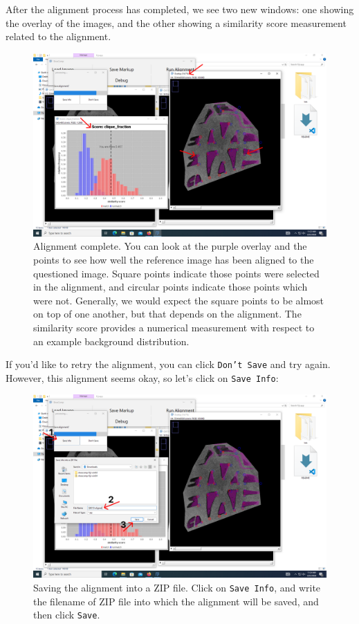 \documentclass[a4paper, oneside]{memoir}
\begin{document}
After the alignment process has completed, we see two new windows: one showing the overlay
of the images, and the other showing a similarity score measurement related to the
alignment.

\begin{figure}[H]
\begin{center}
	\includegraphics[width=0.8\linewidth]{images/step_8c-anno.png}
\end{center}
\caption{Alignment complete. You can look at the purple overlay and the points to see how well the reference image has been aligned to the questioned image. Square points indicate those points were selected in the alignment, and circular points indicate those points which were not. Generally, we would expect the square points to be almost on top of one another, but that depends on the alignment. The similarity score provides a numerical measurement with respect to an example background distribution.}
\label{fig:step8c}
\end{figure}

If you'd like to retry the alignment, you can click \texttt{Don't Save} and try again.
However, this alignment seems okay, so let's click on \texttt{Save Info}:

\begin{figure}[H]
\begin{center}
	\includegraphics[width=0.8\linewidth]{images/step_8d-anno.png}
\end{center}
\caption{Saving the alignment into a ZIP file. Click on \texttt{Save Info}, and write the
filename of ZIP file into which the alignment will be saved, and then click \texttt{Save}.}
\label{fig:step8d}
\end{figure}
\end{document}
